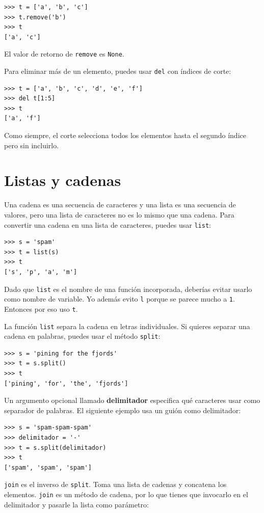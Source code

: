 \documentclass[10pt]{book}
\begin{document}
\begin{verbatim}
>>> t = ['a', 'b', 'c']
>>> t.remove('b')
>>> t
['a', 'c']
\end{verbatim}
%
El valor de retorno de {\tt remove} es {\tt None}.

Para eliminar más de un elemento, puedes usar {\tt del} con
índices de corte:

\begin{verbatim}
>>> t = ['a', 'b', 'c', 'd', 'e', 'f']
>>> del t[1:5]
>>> t
['a', 'f']
\end{verbatim}
%
Como siempre, el corte selecciona todos los elementos hasta el segundo índice
pero sin incluirlo.



\section{Listas y cadenas}

Una cadena es una secuencia de caracteres y una lista es una secuencia
de valores, pero una lista de caracteres no es lo mismo que una
cadena.  Para convertir una cadena en una lista de caracteres,
puedes usar {\tt list}:

\begin{verbatim}
>>> s = 'spam'
>>> t = list(s)
>>> t
['s', 'p', 'a', 'm']
\end{verbatim}
%
Dado que {\tt list} es el nombre de una función incorporada, deberías
evitar usarlo como nombre de variable.  Yo además evito {\tt l} porque
se parece mucho a {\tt 1}.  Entonces por eso uso {\tt t}.

La función {\tt list} separa la cadena en letras individuales.  Si
quieres separar una cadena en palabras, puedes usar
el método {\tt split}:

\begin{verbatim}
>>> s = 'pining for the fjords'
>>> t = s.split()
>>> t
['pining', 'for', 'the', 'fjords']
\end{verbatim}
%
Un argumento opcional llamado {\bf delimitador} especifica qué
caracteres usar como separador de palabras.
El siguiente ejemplo
usa un guión como delimitador:

\begin{verbatim}
>>> s = 'spam-spam-spam'
>>> delimitador = '-'
>>> t = s.split(delimitador)
>>> t
['spam', 'spam', 'spam']
\end{verbatim}
%
{\tt join} es el inverso de {\tt split}.
Toma una lista de cadenas y
concatena los elementos.  {\tt join} es un método de cadena,
por lo que tienes que invocarlo en el delimitador y pasarle la
lista como parámetro:
\end{document}
